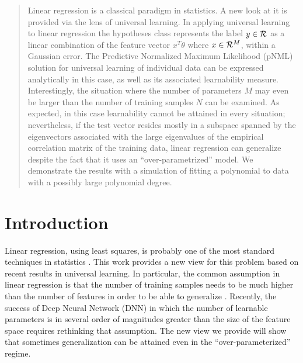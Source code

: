 \documentclass[conference,letterpaper]{IEEEtran}
\begin{document}
\begin{abstract}
Linear regression is a classical paradigm in statistics. 
A new look at it is provided via the lens of universal learning.
In applying universal learning to linear regression the hypotheses class represents the label $y\in {\cal R}$ as a linear combination of the feature vector $x^T\theta$ where $x\in {\cal R}^M$, within a Gaussian error.
The 
Predictive Normalized Maximum Likelihood (pNML) solution for universal learning of individual data can be expressed analytically in this case, as well as its associated learnability measure. 
Interestingly, the situation where the number of parameters $M$ may even be larger than the number of training samples $N$ can be examined. As expected, in this case learnability cannot be attained in every situation; nevertheless, if the test vector resides mostly in a subspace spanned by the eigenvectors associated with the large eigenvalues of the empirical correlation matrix of the training data, linear regression can generalize despite the fact that it uses an ``over-parametrized'' model. 
We demonstrate the results with a simulation of fitting a polynomial to data with a possibly large polynomial degree.
\end{abstract}


\section{Introduction} \label{Introduction}
Linear regression, using least squares, is probably one of the most standard techniques in statistics \cite{lawson1995solving}. This work provides a new view for this problem based on recent results in universal learning. In particular, the common assumption in linear regression is that the number of training samples needs to be much higher than the number of features in order to be able to generalize \cite{james2013introduction}.
Recently, the success of Deep Neural Network (DNN) in which the number of learnable parameters is in several order of magnitudes greater than the size of the feature space requires rethinking that assumption. The new view we provide will show that sometimes generalization can be attained even in the ``over-parameterized'' regime.
\end{document}
